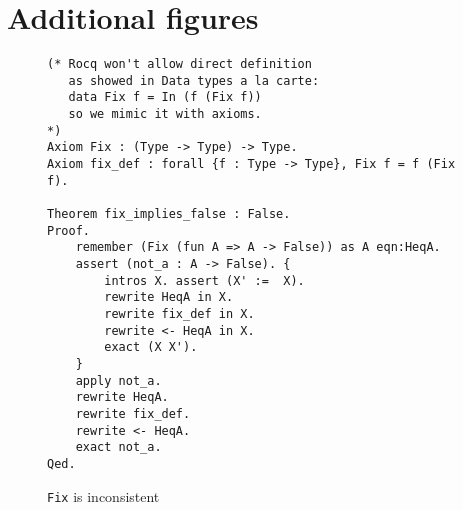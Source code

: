 \documentclass[sigplan,nonacm,review]{acmart}
\begin{document}



\appendix

\section{Additional figures}

\begin{figure}[H]
\begin{lstlisting}[language=Coq]
(* Rocq won't allow direct definition
   as showed in Data types a la carte:
   data Fix f = In (f (Fix f))
   so we mimic it with axioms.
*)
Axiom Fix : (Type -> Type) -> Type.
Axiom fix_def : forall {f : Type -> Type}, Fix f = f (Fix f).

Theorem fix_implies_false : False. 
Proof.
    remember (Fix (fun A => A -> False)) as A eqn:HeqA.
    assert (not_a : A -> False). { 
        intros X. assert (X' :=  X).
        rewrite HeqA in X.
        rewrite fix_def in X.
        rewrite <- HeqA in X.
        exact (X X').
    }
    apply not_a.
    rewrite HeqA.
    rewrite fix_def.
    rewrite <- HeqA.
    exact not_a.
Qed.
\end{lstlisting}
\caption{\texttt{Fix} is inconsistent}
  \label{appendix:false_proof}
\end{figure}
\end{document}
